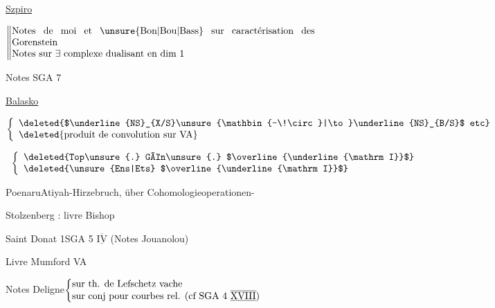 \uline{Szpiro}

\(\left\Vert\begin{array}{@{}p{.91\linewidth}@{}}Notes de moi et \unsure{Bon|Bou|Bass} sur caractérisation des Gorenstein\\Notes sur $\exists$ complexe dualisant en dim 1\end{array}\right.\)

Notes SGA 7




\uline{Balasko}

\quad\(\left\{\begin{array}{l}\text{\deleted{$\underline{NS}_{X/S}\unsure{\mathbin{-\!\circ}|\to}\underline{NS}_{B/S}$ etc}}\\\text{\deleted{produit de convolution sur VA}}\end{array}\right.\)




\qquad {}\ \(\left\{\begin{array}{l}\text{\deleted{Top\unsure{.} Gén\unsure{.} $\overline{\underline{\mathrm I}}$}}\\\text{\deleted{\unsure{Ens|Ets} $\overline{\underline{\mathrm I}}$}}\end{array}\right.\)

Poenaru\qquad Atiyah-Hirzebruch, über Cohomologieoperationen- \unsure{-\, -\, -\, -\, -|\ldots}

Stolzenberg :  livre Bishop \unsure{\ldots|---}



Saint Donat 1\qquad SGA 5 $\overline{\underline{\mathrm{IV}}}$ (Notes Jouanolou)


Livre Mumford VA

Notes Deligne\qquad \(\left\{\begin{array}{@{}p{.67\linewidth}@{}}sur th. de Lefschetz vache\\sur conj pour courbes rel. (cf SGA 4 $\overline{\underline{\mathrm{XVIII}}}$)\end{array}\right.\)

\clearpage
